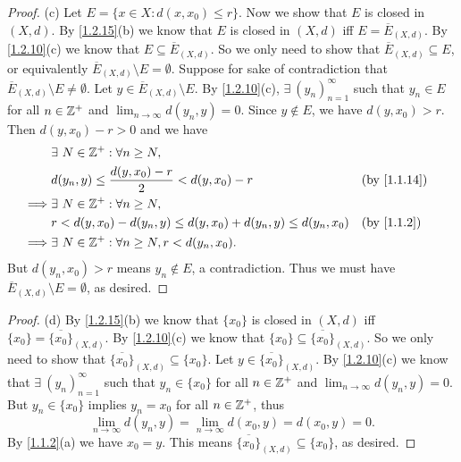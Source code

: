 \begin{proof}{(c)}
  Let \(E = \{x \in X : d(x, x_0) \leq r\}\).
  Now we show that \(E\) is closed in \((X, d)\).
  By \cref{1.2.15}(b) we know that \(E\) is closed in \((X, d)\) iff \(E = \overline{E}_{(X, d)}\).
  By \cref{1.2.10}(c) we know that \(E \subseteq \overline{E}_{(X, d)}\).
  So we only need to show that \(\overline{E}_{(X, d)} \subseteq E\), or equivalently \(\overline{E}_{(X, d)} \setminus E = \emptyset\).
  Suppose for sake of contradiction that \(\overline{E}_{(X, d)} \setminus E \neq \emptyset\).
  Let \(y \in \overline{E}_{(X, d)} \setminus E\).
  By \cref{1.2.10}(c), \(\exists\ (y_n)_{n = 1}^\infty\) such that \(y_n \in E\) for all \(n \in \mathbb{Z}^+\) and \(\lim_{n \to \infty} d(y_n, y) = 0\).
  Since \(y \notin E\), we have \(d(y, x_0) > r\).
  Then \(d(y, x_0) - r > 0\) and we have
  \begin{align*}
             & \exists\ N \in \Z^+ : \forall n \geq N,                                                              \\
             & d(y_n, y) \leq \dfrac{d(y, x_0) - r}{2} < d(y, x_0) - r               &  & \text{(by \cref{1.1.14})} \\
    \implies & \exists\ N \in \Z^+ : \forall n \geq N,                                                              \\
             & r < d(y, x_0) - d(y_n, y) \leq d(y, x_0) + d(y_n, y) \leq d(y_n, x_0) &  & \text{(by \cref{1.1.2})}  \\
    \implies & \exists\ N \in \Z^+ : \forall n \geq N, r < d(y_n, x_0).
  \end{align*}
  But \(d(y_n, x_0) > r\) means \(y_n \notin E\), a contradiction.
  Thus we must have \(\overline{E}_{(X, d)} \setminus E = \emptyset\), as desired.
\end{proof}

\begin{proof}{(d)}
  By \cref{1.2.15}(b) we know that \(\{x_0\}\) is closed in \((X, d)\) iff \(\{x_0\} = \overline{\{x_0\}}_{(X, d)}\).
  By \cref{1.2.10}(c) we know that \(\{x_0\} \subseteq \overline{\{x_0\}}_{(X, d)}\).
  So we only need to show that \(\overline{\{x_0\}}_{(X, d)} \subseteq \{x_0\}\).
  Let \(y \in \overline{\{x_0\}}_{(X, d)}\).
  By \cref{1.2.10}(c) we know that \(\exists\ (y_n)_{n = 1}^\infty\) such that \(y_n \in \{x_0\}\) for all \(n \in \mathbb{Z}^+\) and \(\lim_{n \to \infty} d(y_n, y) = 0\).
  But \(y_n \in \{x_0\}\) implies \(y_n = x_0\) for all \(n \in \mathbb{Z}^+\), thus
  \[
    \lim_{n \to \infty} d(y_n, y) = \lim_{n \to \infty} d(x_0, y) = d(x_0, y) = 0.
  \]
  By \cref{1.1.2}(a) we have \(x_0 = y\).
  This means \(\overline{\{x_0\}}_{(X, d)} \subseteq \{x_0\}\), as desired.
\end{proof}

